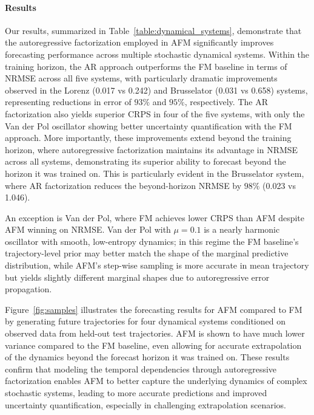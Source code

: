 \documentclass[preprint,12pt,authoryear]{elsarticle}
\newcommand{\oldrev}[1]{#1}
\newcommand{\rev}[1]{#1}
\newcommand{\rev}[1]{\textcolor{blue}{#1}}
\begin{document}
\paragraph{Results}
Our results, summarized in Table~\ref{table:dynamical_systems}, demonstrate that the autoregressive factorization employed in AFM significantly improves forecasting performance across multiple stochastic dynamical systems. \rev{Within the training horizon}, the AR approach outperforms the FM baseline in terms of NRMSE across all five systems, with particularly dramatic improvements observed in the Lorenz (0.017 vs 0.242) and Brusselator (0.031 vs 0.658) systems, representing reductions in error of $93\%$ and $95\%$, respectively. The AR factorization also yields superior CRPS in four of the five systems, with only the Van der Pol oscillator showing better uncertainty quantification with the FM approach. More importantly, these improvements extend \rev{beyond the training horizon}, where autoregressive factorization maintains its advantage in NRMSE across all systems, demonstrating its superior ability to \rev{forecast beyond the horizon it was trained on}. This is particularly evident in the Brusselator system, where AR factorization reduces the \rev{beyond-horizon} NRMSE by $98\%$ (0.023 vs 1.046). 


\oldrev{An exception is Van der Pol, where FM achieves lower CRPS than AFM despite AFM winning on NRMSE. Van der Pol with $\mu=0.1$ is a nearly harmonic oscillator with smooth, low-entropy dynamics; in this regime the FM baseline's trajectory-level prior may better match the shape of the marginal predictive distribution, while AFM's step-wise sampling is more accurate in mean trajectory but yields slightly different marginal shapes due to autoregressive error propagation.}

Figure~\ref{fig:samples} illustrates the forecasting results for AFM compared to FM by generating future trajectories for four dynamical systems conditioned on observed data \rev{from held-out test trajectories}. AFM is shown to have much lower variance compared to the FM baseline, even allowing for accurate extrapolation of the dynamics beyond the \rev{forecast horizon} it was trained on. These results confirm that modeling the temporal dependencies through autoregressive factorization enables AFM to better capture the underlying dynamics of complex stochastic systems, leading to more accurate predictions and improved uncertainty quantification, especially in challenging extrapolation scenarios.
\end{document}
